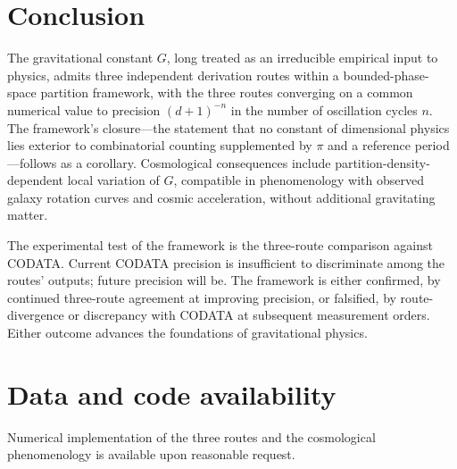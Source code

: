 \documentclass[11pt,twocolumn,a4paper]{article}
\theoremstyle{definition}
\theoremstyle{remark}
\newcommand{\Gnewton}{G}
\begin{document}
\section{Conclusion}
\label{sec:conclusion}

The gravitational constant $\Gnewton$, long treated as an irreducible empirical input to physics, admits three independent derivation routes within a bounded-phase-space partition framework, with the three routes converging on a common numerical value to precision ${(d+1)}^{-n}$ in the number of oscillation cycles $n$. The framework's closure---the statement that no constant of dimensional physics lies exterior to combinatorial counting supplemented by $\pi$ and a reference period---follows as a corollary. Cosmological consequences include partition-density-dependent local variation of $\Gnewton$, compatible in phenomenology with observed galaxy rotation curves and cosmic acceleration, without additional gravitating matter.

The experimental test of the framework is the three-route comparison against CODATA. Current CODATA precision is insufficient to discriminate among the routes' outputs; future precision will be. The framework is either confirmed, by continued three-route agreement at improving precision, or falsified, by route-divergence or discrepancy with CODATA at subsequent measurement orders. Either outcome advances the foundations of gravitational physics.

\section*{Data and code availability}

Numerical implementation of the three routes and the cosmological phenomenology is available upon reasonable request.



\end{document}
